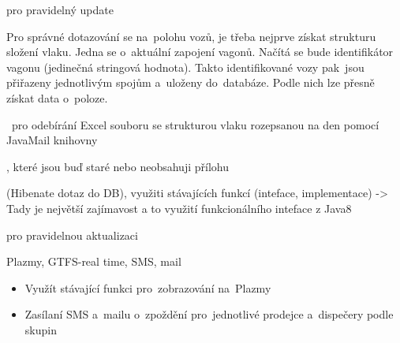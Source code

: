  pro pravidelný update


Pro správné dotazování se na~polohu vozů, je třeba nejprve získat strukturu složení vlaku. Jedna se o~aktuální zapojení vagonů. Načítá se bude identifikátor vagonu (jedinečná stringová hodnota). Takto identifikované vozy pak~jsou přiřazeny jednotlivým spojům a~uloženy do~databáze. Podle nich lze přesně získat data o~poloze.

	
	
	
	
	
	
~pro odebírání Excel souboru se strukturou vlaku rozepsanou na den
 pomocí JavaMail knihovny
	
	
, které jsou buď staré nebo neobsahuji přílohu
	
	
	
 (Hibenate dotaz do DB), využiti stávajících funkcí
 (inteface, implementace) -> Tady je největší zajímavost a to využití funkcionálního inteface z Java8~\cite{java8}
	
	
 pro pravidelnou aktualizaci
	
	

Plazmy, GTFS-real time, SMS, mail

\begin{itemize}
	\item Využít stávající funkci pro~zobrazování na~Plazmy
	\item Zasílaní SMS a~mailu o~zpoždění pro~jednotlivé prodejce a~dispečery podle skupin
\end{itemize}

